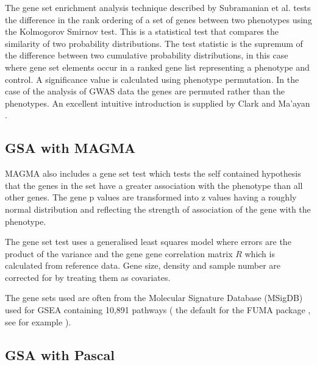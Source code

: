 The gene set enrichment analysis technique described by Subramanian et al. \cite{subramanian2005gene} tests the difference in the rank ordering of a set of genes between two phenotypes using the Kolmogorov Smirnov test. This is a statistical test that compares the similarity of two probability distributions. The test statistic is the supremum of the difference between two cumulative probability distributions, in this case where gene set elements occur in a ranked gene list  representing a phenotype and control. A significance value is calculated using phenotype permutation. In the case of the analysis of GWAS data the genes are permuted rather than the phenotypes\cite{zyla2017ranking}. An excellent intuitive introduction is supplied by Clark and Ma'ayan \cite{clark2011introduction}. 

\subsection{GSA with MAGMA}
\label{sec:GSA MAGMA}
MAGMA also includes a gene set test which tests the self contained hypothesis that the genes in the set have a greater association with the phenotype than all other genes. The gene p values are transformed into z values having a roughly normal distribution and reflecting the strength of association of the gene with the phenotype. 

The gene set test uses a generalised least squares model where errors are the product of the variance and the gene gene correlation matrix $R$ which is calculated from reference data. Gene size, density and sample number are corrected for by treating them as covariates.

The gene sets used are often from the Molecular Signature Database (MSigDB)\cite{liberzon2015molecular} used for GSEA containing 10,891 pathways ( the default for the FUMA package \cite{watanabe2017functional},  see for example \cite{dashti2019genome}).
\subsection{GSA with Pascal}
\label{sec:GSA with PASCAL}


